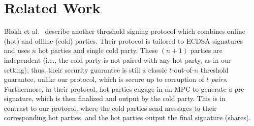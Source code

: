 \section{Related Work}

Blokh et al.~\cite{EPRINT:BloMakPel22} describe another threshold signing protocol which combines online (hot) and offline (cold) parties. Their protocol is tailored to ECDSA signatures and uses $n$ hot parties and single cold party. These $(n+1)$ parties are independent (i.e., the cold party is not paired with any hot party, as in our setting); thus, their security guarantee is still a classic $t$-out-of-$n$ threshold guarantee, unlike our protocol, which is secure up to corruption of $t$ \emph{pairs}. Furthermore, in their protocol, hot parties engage in an MPC to generate a pre-signature, which is then finalized and output by the cold party. This is in contrast to our protocol, where the cold parties send messages to their corresponding hot parties, and the hot parties output the final signature (shares).